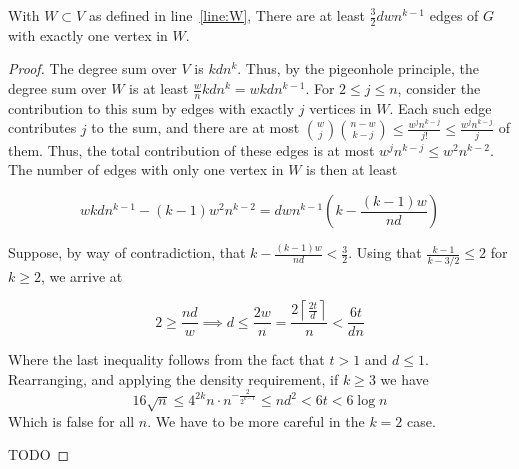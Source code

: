 \begin{lemma}\label{many_edges}
    With $W  \subset V$ as defined in line~\ref{line:W},
    There are at least $\frac{3}{2}dwn^{k-1}$ edges of $G$ with exactly one vertex in $W$.
    \begin{proof}
        The degree sum over $V$ is $kdn^{k}$.
        Thus, by the pigeonhole principle, the degree sum over $W$ is at least
        $\frac{w}{n}kdn^{k} = wkdn^{k-1}$.
        For $2 \leq j \leq n$, consider the contribution to this sum by edges with exactly $j$ vertices in $W$.
        Each such edge contributes $j$ to the sum, and there are at most
        $\binom{w}{j}\binom{n-w}{k-j} \leq \frac{w^j n^{k-j}}{j!} \leq \frac{w^j n^{k-j}}{j}$ of them.
        Thus, the total contribution of these edges is at most $w^j n^{k-j} \leq w^{2}n^{k-2}$.
        The number of edges with only one vertex in $W$ is then at least

        \[
            wkdn^{k-1} - (k-1)w^{2}n^{k-2} = dwn^{k-1} \left( k - \frac{(k-1)w}{nd}\right)
        \]

        Suppose, by way of contradiction,
        that $ k - \frac{(k-1)w}{nd} < \frac{3}{2}$.
        Using that $\frac{k-1}{k-3/2} \leq 2$
        for $k \geq 2$, we arrive at

        \[
            2 \geq  \frac{nd}{w} \implies d \leq \frac{2w}{n} = \frac{2 \left\lceil\frac{2t}{d} \right\rceil}{n}
            < \frac{6t}{dn}
        \]

        Where the last inequality follows from the fact that $t > 1$ and $d \leq 1$.
        Rearranging, and applying the density requirement, if $k \geq 3$ we have
        \[
            16 \sqrt {n} \leq 4^{2k} n \cdot n^{-\frac{2}{2^{k-1}}} \leq nd^2 < 6t < 6 \log n
        \]
        Which is false for all $n$.
        We have to be more careful in the $k = 2$ case.

        TODO %

    \end{proof}
\end{lemma}


